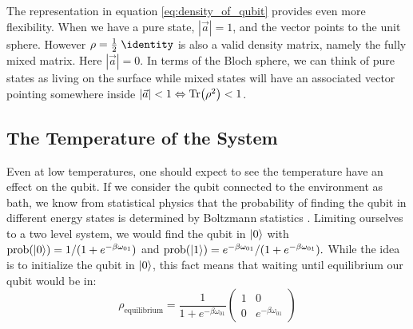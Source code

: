 The representation in equation \ref{eq:density_of_qubit} provides even more flexibility. When we have a pure state, $|\Vec{a}| = 1$, and the vector points to the unit sphere. However $\rho = \frac12 \; \identity$ is also a valid density matrix, namely the fully mixed matrix. Here $|\Vec{a}|=0$. In terms of the Bloch sphere, we can think of pure states as living on the surface while mixed states will have an associated vector pointing somewhere inside $|\Vec{a}|<1\Leftrightarrow \Tr(\rho^2) < 1$.

\subsection{The Temperature of the System}
Even at low temperatures, one should expect to see the temperature have an effect on the qubit. If we consider the qubit connected to the environment as bath, we know from statistical physics that the probability of finding the qubit in different energy states is determined by Boltzmann statistics \cite{kittel_thermal_1980}. Limiting ourselves to a two level system, we would find the qubit in $\ket{0}$ with $\text{prob}(\ket{0}) = 1 / (1 + e^{-\beta\omega_{01}})$ and $\text{prob}(\ket{1}) = e^{-\beta\omega_{01}} / (1 + e^{-\beta\omega_{01}}).$ While the idea is to initialize the qubit in $\ket{0}$, this fact means that waiting until equilibrium our qubit would be in:
\begin{equation}\label{eq:equilibrium_qubit_density_matrix}
    \rho_{\text{equilibrium}} = \frac{1}{1 + e^{-\beta\omega_{01}}}\begin{pmatrix}
        1 & 0 \\
        0 & e^{-\beta\omega_{01}}
    \end{pmatrix}
\end{equation}

